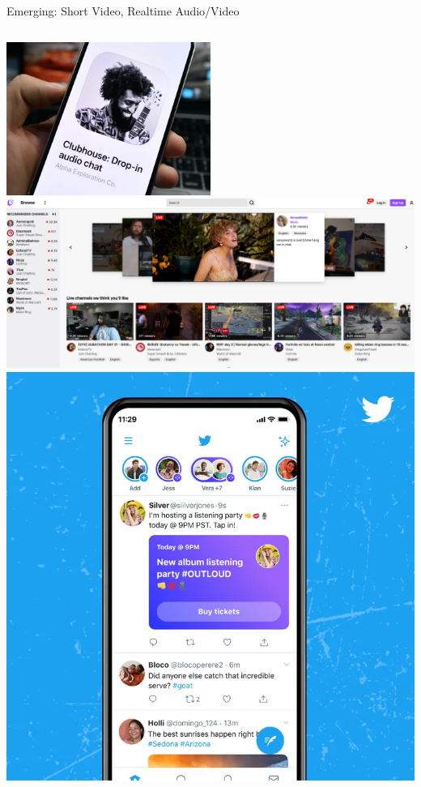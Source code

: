 \documentclass[nobackground,dvipsnames,table,aspectratio=169]{beamer}
\begin{document}
\begin{frame}{Emerging: Short Video, Realtime Audio/Video}
\begin{columns}
            \includegraphics[width=0.5\textwidth]{clubhouse}
            \includegraphics[width=\textwidth]{twitch}
            \includegraphics[width=\textwidth]{listening-party}
    \end{columns}
\end{frame}
\end{document}
